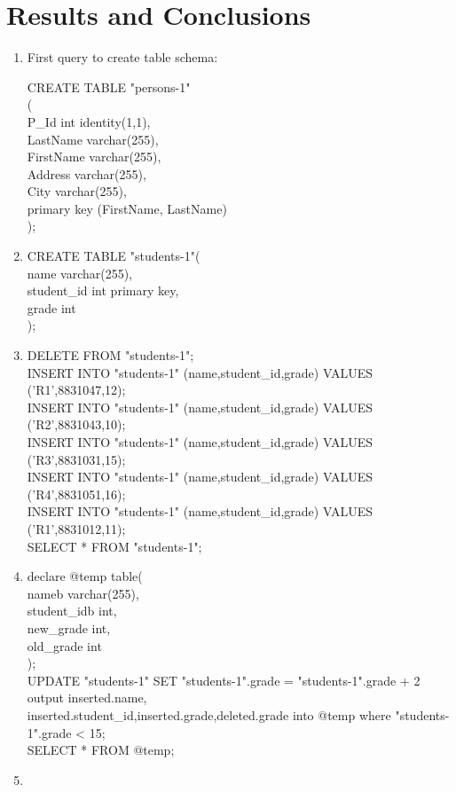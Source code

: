 \documentclass{article}
\begin{document}
\section{Results and Conclusions}
\begin{enumerate}
    \item
        First query to create table schema:

        CREATE TABLE "persons-1"\\
        (\\
        P\_Id  int identity(1,1),\\
        LastName varchar(255),\\
        FirstName varchar(255),\\
        Address varchar(255),\\
        City varchar(255),\\
        primary key (FirstName, LastName)\\
        );\\

    \item
        CREATE TABLE "students-1"(\\
        name varchar(255),\\
        student\_id int primary key,\\
        grade int\\
        );\\
    \item
        DELETE FROM "students-1";\\
        INSERT INTO "students-1" (name,student\_id,grade) VALUES ('R1',8831047,12);\\
        INSERT INTO "students-1" (name,student\_id,grade) VALUES ('R2',8831043,10);\\
        INSERT INTO "students-1" (name,student\_id,grade) VALUES ('R3',8831031,15);\\
        INSERT INTO "students-1" (name,student\_id,grade) VALUES ('R4',8831051,16);\\
        INSERT INTO "students-1" (name,student\_id,grade) VALUES ('R1',8831012,11);\\
        SELECT * FROM "students-1";\\
    \item
        declare @temp table(\\
        nameb varchar(255),\\
        student\_idb int,\\
        new\_grade int,\\
        old\_grade int\\
        );\\
        UPDATE "students-1" SET "students-1".grade = "students-1".grade + 2 output inserted.name,\\
        inserted.student\_id,inserted.grade,deleted.grade into @temp where "students-1".grade < 15;\\
        SELECT * FROM @temp;\\
    \item %
\end{enumerate}
\end{document}
